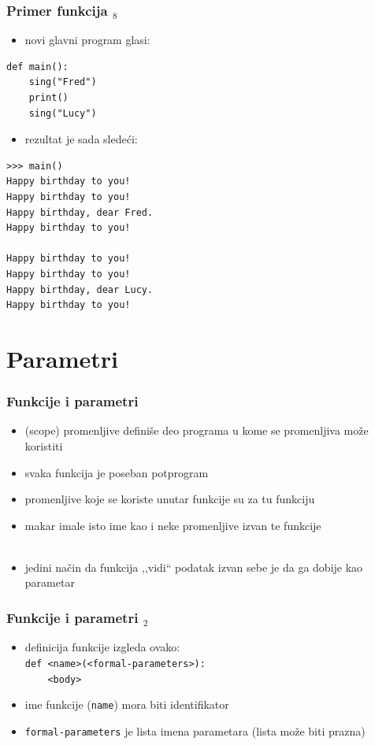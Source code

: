 \documentclass[utf8,compress]{beamer}
\begin{document}
\begin{frame}[fragile,shrink=10]
  \frametitle{Primer funkcija $_8$}
  \begin{itemize}
    \item novi glavni program glasi:
  \end{itemize}
\begin{verbatim}
def main():
    sing("Fred")
    print()
    sing("Lucy")
\end{verbatim}
  \begin{itemize}
    \item rezultat je sada sledeći:
  \end{itemize}
\begin{verbatim}
>>> main()
Happy birthday to you!
Happy birthday to you!
Happy birthday, dear Fred.
Happy birthday to you!

Happy birthday to you!
Happy birthday to you!
Happy birthday, dear Lucy.
Happy birthday to you!
\end{verbatim}
\end{frame}

\section{Parametri}

\begin{frame}[fragile]
  \frametitle{Funkcije i parametri}
  \begin{itemize}
    \item {} (scope) promenljive definiše deo programa u kome se promenljiva može koristiti
    \item svaka funkcija je poseban potprogram
    \item promenljive koje se koriste unutar funkcije su  za tu funkciju
    \item makar imale isto ime kao i neke promenljive izvan te funkcije \\ \ \\
    \item jedini način da funkcija ,,vidi`` podatak izvan sebe je da ga dobije kao parametar
  \end{itemize}
\end{frame}

\begin{frame}[fragile]
  \frametitle{Funkcije i parametri $_2$}
  \begin{itemize}
    \item definicija funkcije izgleda ovako: \\
      \texttt{def <name>(<formal-parameters>):} \\
      \texttt{\ \ \ \ <body>}
    \item ime funkcije (\texttt{name}) mora biti identifikator
    \item \texttt{formal-parameters} je lista imena parametara (lista može biti prazna)
  \end{itemize}
\end{frame}
\end{document}
